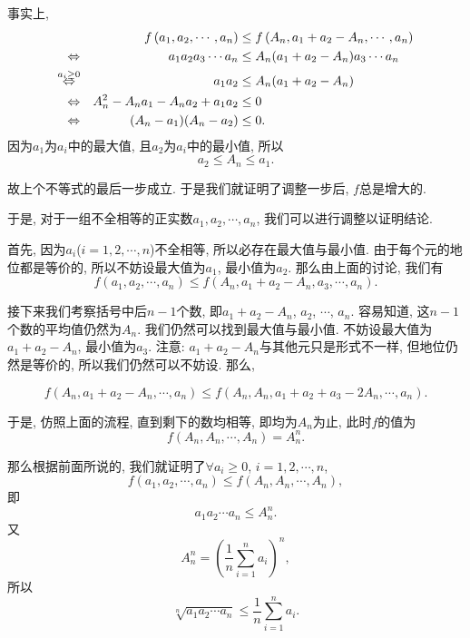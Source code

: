 \documentclass[serif]{beamer}
\begin{document}
\begin{frame}
	事实上,
	\begin{align*}
		&&f\left(a_1,a_2,\cdots,a_n\right)&\le f\left(A_n,a_1+a_2-A_n,\cdots,a_n\right)\\
		\Leftrightarrow&&a_1a_2a_3\cdots a_n&\le A_n(a_1+a_2-A_n)a_3\cdots a_n\\
		\overset{\small a_i\ge0}{\Leftrightarrow}&&a_1a_2&\le A_n(a_1+a_2-A_n)\\
		\Leftrightarrow&&A_n^2-A_na_1-A_na_2+a_1a_2&\le0\\
		\Leftrightarrow&&(A_n-a_1)(A_n-a_2)&\le0.
	\end{align*}
	因为$a_1$为$a_i$中的最大值, 且$a_2$为$a_i$中的最小值, 所以
	\[a_2\le A_n\le a_1.\]\par
	故上个不等式的最后一步成立. 于是我们就证明了调整一步后, $f$总是增大的.
\end{frame}

\begin{frame}
	于是, 对于一组不全相等的正实数$a_1,a_2,\cdots,a_n$, 我们可以进行调整以证明结论.\par
	首先, 因为$a_i$($i=1,2,\cdots,n$)不全相等, 所以必存在最大值与最小值. 由于每个元的地位都是等价的, 所以不妨设最大值为$a_1$, 最小值为$a_2$. 那么由上面的讨论, 我们有
	\[f\left(a_1,a_2,\cdots,a_n\right)\le f\left(A_n,a_1+a_2-A_n,a_3,\cdots,a_n\right).\]\par
	接下来我们考察括号中后$n-1$个数, 即$a_1+a_2-A_n$, $a_2$, $\cdots$, $a_n$. 容易知道, 这$n-1$个数的平均值仍然为$A_n$. 我们仍然可以找到最大值与最小值. 不妨设最大值为$a_1+a_2-A_n$, 最小值为$a_3$. 注意: $a_1+a_2-A_n$与其他元只是形式不一样, 但地位仍然是等价的, 所以我们仍然可以不妨设. 那么,
	\begin{small}
		\[f\left(A_n,a_1+a_2-A_n,\cdots,a_n\right)\le f\left(A_n,A_n,a_1+a_2+a_3-2A_n,\cdots,a_n\right).\]
	\end{small}
\end{frame}

\begin{frame}
	于是, 仿照上面的流程, 直到剩下的数均相等, 即均为$A_n$为止, 此时$f$的值为
	\[f\left(A_n,A_n,\cdots,A_n\right)=A_n^n.\]\par
	那么根据前面所说的, 我们就证明了$\forall a_i\ge0$, $i=1,2,\cdots,n$,
	\[f\left(a_1,a_2,\cdots,a_n\right)\le f\left(A_n,A_n,\cdots,A_n\right),\]
	即
	\[a_1a_2\cdots a_n\le A_n^n.\]
	又
	\[A_n^n=\left(\frac{1}{n}\sum\limits_{i=1}^n{a_i}\right)^n,\]
	所以
	\[\sqrt[n]{a_1a_2\cdots a_n}\le\frac{1}{n}\sum\limits_{i=1}^n{a_i}.\]
\end{frame}
\end{document}
